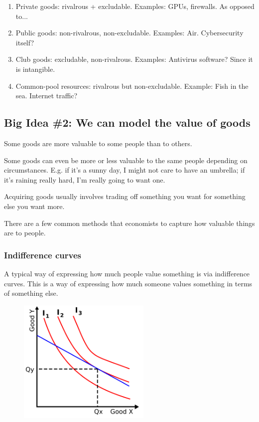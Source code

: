 \documentclass[11pt]{article}
\begin{document}
\begin{enumerate}
    \item Private goods: rivalrous + excludable. Examples: GPUs, firewalls. As opposed to...
    \item Public goods: non-rivalrous, non-excludable. Examples: Air. Cybersecurity itself?
    \item Club goods: excludable, non-rivalrous. Examples: Antivirus software? Since it is intangible. 
    \item Common-pool resources: rivalrous but non-excludable. Example: Fish in the sea. Internet traffic?
\end{enumerate}


\subsection{Big Idea \#2: We can model the value of goods}

Some goods are more valuable to some people than to others.

Some goods can even be more or less valuable to the same people depending on circumstances.
E.g. if it's a sunny day, I might not care to have an umbrella; if it's raining really hard, I'm really going to want one. 

Acquiring goods usually involves trading off something you want for something else you want more. 

There are a few common methods that economists to capture how valuable things are to people.

\subsubsection{Indifference curves}

A typical way of expressing how much people value something is via indifference curves. This is a way of expressing how much someone values something in terms of something else. 

\begin{figure}[h]
    \centering
    \includegraphics*[width=2.5in]{indifference.png}
\end{figure}
 
\end{document}
